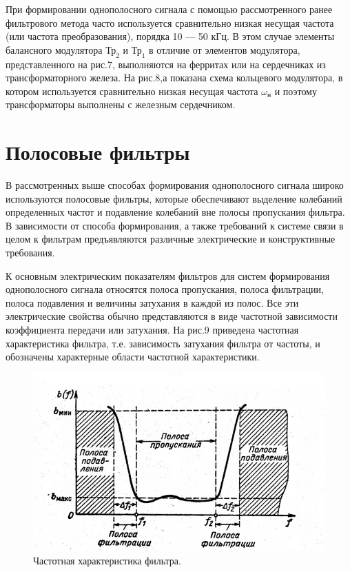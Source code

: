 При формировании однополосного сигнала с помощью рассмотренного ранее фильтрового метода часто используется сравнительно низкая несущая частота (или частота преобразования), порядка 10 — 50 кГц. В этом случае элементы балансного модулятора $\text{Тр}_2$ и $\text{Тр}_1$ в отличие от элементов модулятора, представленного на рис.7, выполняются на ферритах или на сердечниках из трансформаторного железа. На рис.8,а показана схема кольцевого модулятора, в котором используется сравнительно низкая несущая частота $\omega_{\text{н}}$ и поэтому трансформаторы выполнены с железным сердечником.

\section{Полосовые фильтры}

В рассмотренных выше способах формирования однополосного сигнала широко используются полосовые фильтры, которые обеспечивают выделение колебаний определенных частот и подавление колебаний вне полосы пропускания фильтра. В зависимости от способа формирования, а также требований к системе связи в целом к фильтрам предъявляются различные электрические и конструктивные требования.

К основным электрическим показателям фильтров для систем формирования однополосного сигнала относятся полоса пропускания, полоса фильтрации, полоса подавления и величины затухания в каждой из полос. Все эти электрические свойства обычно представляются в виде частотной зависимости коэффициента передачи или затухания. На рис.9 приведена частотная характеристика фильтра, т.е. зависимость затухания фильтра от частоты, и обозначены характерные области частотной характеристики. 

\begin{figure}[h!]
	\centering
	\includegraphics[width=0.8\linewidth]{fig/fig9}
	\caption{ Частотная характеристика фильтра.}
	\label{fig:fig9}
\end{figure}

